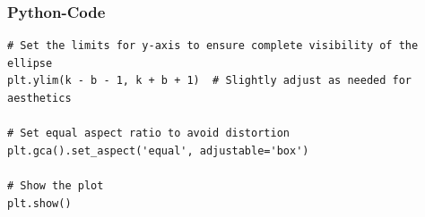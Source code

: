\documentclass{beamer}
\begin{document}
\begin{frame}[fragile]
\frametitle{Python-Code}
\begin{lstlisting}
# Set the limits for y-axis to ensure complete visibility of the ellipse
plt.ylim(k - b - 1, k + b + 1)  # Slightly adjust as needed for aesthetics

# Set equal aspect ratio to avoid distortion
plt.gca().set_aspect('equal', adjustable='box')

# Show the plot
plt.show()
\end{lstlisting}
\end{frame}
\end{document}
